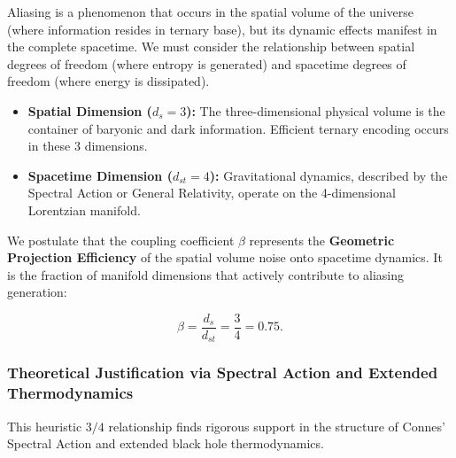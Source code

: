 \documentclass[12pt, a4paper]{article}
\theoremstyle{plain}
\theoremstyle{definition}
\begin{document}
Aliasing is a phenomenon that occurs in the spatial volume of the universe (where information resides in ternary base), but its dynamic effects manifest in the complete spacetime. We must consider the relationship between spatial degrees of freedom (where entropy is generated) and spacetime degrees of freedom (where energy is dissipated).

\begin{itemize}
    \item \textbf{Spatial Dimension ($d_s = 3$):} The three-dimensional physical volume is the container of baryonic and dark information. Efficient ternary encoding occurs in these 3 dimensions.
    \item \textbf{Spacetime Dimension ($d_{st} = 4$):} Gravitational dynamics, described by the Spectral Action or General Relativity, operate on the 4-dimensional Lorentzian manifold.
\end{itemize}

We postulate that the coupling coefficient $\beta$ represents the \textbf{Geometric Projection Efficiency} of the spatial volume noise onto spacetime dynamics. It is the fraction of manifold dimensions that actively contribute to aliasing generation:

\begin{equation}
\beta = \frac{d_s}{d_{st}} = \frac{3}{4} = 0.75.
\label{eq:beta_projection}
\end{equation}

\subsubsection{Theoretical Justification via Spectral Action and Extended Thermodynamics}

This heuristic $3/4$ relationship finds rigorous support in the structure of Connes' Spectral Action and extended black hole thermodynamics.
\end{document}
